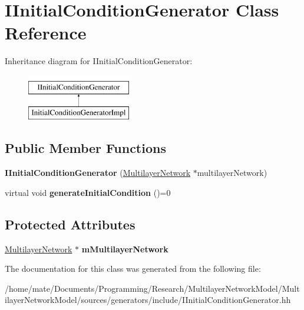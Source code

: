 \hypertarget{classIInitialConditionGenerator}{}\section{I\+Initial\+Condition\+Generator Class Reference}
\label{classIInitialConditionGenerator}
Inheritance diagram for I\+Initial\+Condition\+Generator\+:\begin{figure}[H]
\begin{center}
\leavevmode
\includegraphics[height=2.000000cm]{classIInitialConditionGenerator}
\end{center}
\end{figure}
\subsection*{Public Member Functions}
\begin{DoxyCompactItemize}
\item 
{\bfseries I\+Initial\+Condition\+Generator} (\hyperlink{classMultilayerNetwork}{Multilayer\+Network} $\ast$multilayer\+Network)\hypertarget{classIInitialConditionGenerator_a23bef59a851914a65f67c2bd7736ad37}{}\label{classIInitialConditionGenerator_a23bef59a851914a65f67c2bd7736ad37}

\item 
virtual void {\bfseries generate\+Initial\+Condition} ()=0\hypertarget{classIInitialConditionGenerator_aaee78296548634e00150023baa051e52}{}\label{classIInitialConditionGenerator_aaee78296548634e00150023baa051e52}

\end{DoxyCompactItemize}
\subsection*{Protected Attributes}
\begin{DoxyCompactItemize}
\item 
\hyperlink{classMultilayerNetwork}{Multilayer\+Network} $\ast$ {\bfseries m\+Multilayer\+Network}\hypertarget{classIInitialConditionGenerator_a7144fdc9973103d6b377958868b4b387}{}\label{classIInitialConditionGenerator_a7144fdc9973103d6b377958868b4b387}

\end{DoxyCompactItemize}


The documentation for this class was generated from the following file\+:\begin{DoxyCompactItemize}
\item 
/home/mate/\+Documents/\+Programming/\+Research/\+Multilayer\+Network\+Model/\+Multilayer\+Network\+Model/sources/generators/include/I\+Initial\+Condition\+Generator.\+hh\end{DoxyCompactItemize}
